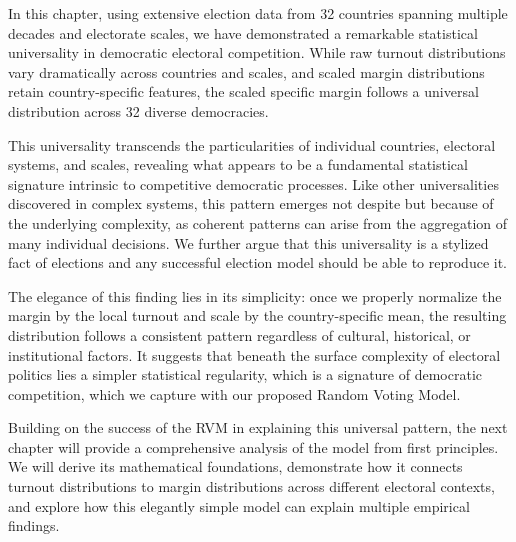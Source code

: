 In this chapter, using extensive election data from 32 countries spanning multiple decades and electorate scales, we have demonstrated a remarkable statistical universality in democratic electoral competition. While raw turnout distributions vary dramatically across countries and scales, and scaled margin distributions retain country-specific features, the scaled specific margin follows a universal distribution across 32 diverse democracies.

This universality transcends the particularities of individual countries, electoral systems, and scales, revealing what appears to be a fundamental statistical signature intrinsic to competitive democratic processes. Like other universalities discovered in complex systems, this pattern emerges not despite but because of the underlying complexity, as coherent patterns can arise from the aggregation of many individual decisions. We further argue that this universality is a stylized fact of elections and any successful election model should be able to reproduce it.

The elegance of this finding lies in its simplicity: once we properly normalize the margin by the local turnout and scale by the country-specific mean, the resulting distribution follows a consistent pattern regardless of cultural, historical, or institutional factors. It suggests that beneath the surface complexity of electoral politics lies a simpler statistical regularity, which is a signature of democratic competition, which we capture with our proposed Random Voting Model.

Building on the success of the RVM in explaining this universal pattern, the next chapter will provide a comprehensive analysis of the model from first principles. We will derive its mathematical foundations, demonstrate how it connects turnout distributions to margin distributions across different electoral contexts, and explore how this elegantly simple model can explain multiple empirical findings.